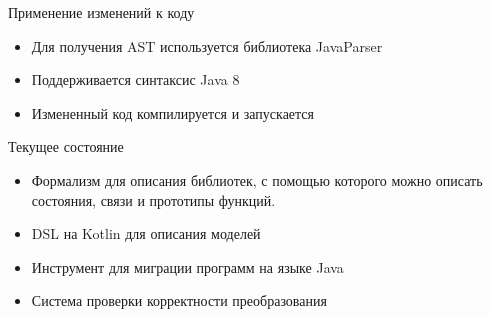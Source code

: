 \documentclass[12pt]{beamer}
\begin{document}
{
\begin{frame}{Применение изменений к коду}
	\begin{mybox}[]
  \begin{itemize}
  	\item Для получения AST используется библиотека JavaParser
  	\item Поддерживается синтаксис Java 8
  	\item Измененный код компилируется и запускается
  \end{itemize}
\end{mybox}
\end{frame}
}

{
\begin{frame}{Текущее состояние}
  \begin{mybox}[]
  \begin{itemize}
  	\item Формализм для описания библиотек, с помощью которого можно описать состояния, связи и прототипы функций.
  	\item DSL на Kotlin для описания моделей
  	\item Инструмент для миграции программ на языке Java
  	\item Система проверки корректности преобразования
  \end{itemize}
  \end{mybox}
\end{frame}
}
\end{document}
